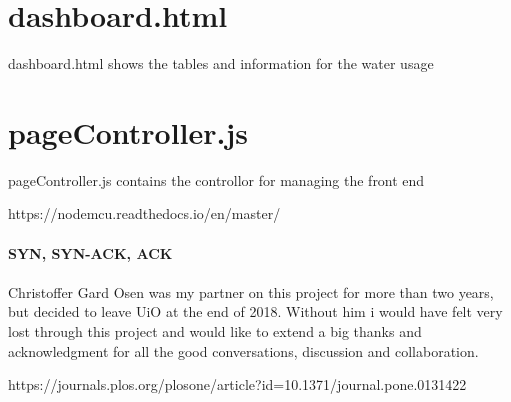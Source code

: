 \documentclass[]{uiophd}
\begin{document}
\section{dashboard.html}
dashboard.html shows the tables and information for the water usage


\section{pageController.js}
pageController.js contains the controllor for managing the front end


https://nodemcu.readthedocs.io/en/master/
\\\\
\textbf{SYN, SYN-ACK, ACK}
\\\\
Christoffer Gard Osen was my partner on this project for more than two years, but decided to leave UiO at the end of 2018. Without him i would have felt very lost through this project and would like to extend a big thanks and acknowledgment for all the good conversations, discussion and collaboration.



https://journals.plos.org/plosone/article?id=10.1371/journal.pone.0131422
\end{document}
